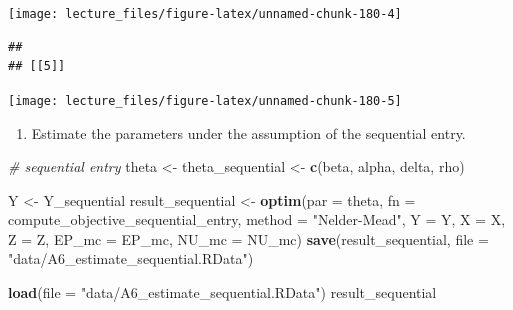 \documentclass[]{book}
\newenvironment{Shaded}{\begin{snugshade}}{\end{snugshade}}
\newcommand{\KeywordTok}[1]{\textcolor[rgb]{0.13,0.29,0.53}{\textbf{#1}}}
\newcommand{\DataTypeTok}[1]{\textcolor[rgb]{0.13,0.29,0.53}{#1}}
\newcommand{\StringTok}[1]{\textcolor[rgb]{0.31,0.60,0.02}{#1}}
\newcommand{\CommentTok}[1]{\textcolor[rgb]{0.56,0.35,0.01}{\textit{#1}}}
\newcommand{\NormalTok}[1]{#1}
\providecommand{\tightlist}{%
  \setlength{\itemsep}{0pt}\setlength{\parskip}{0pt}}
\begin{document}
\begin{center}\texttt{[image: lecture\_files/figure-latex/unnamed-chunk-180-4]} \end{center}

\begin{verbatim}
## 
## [[5]]
\end{verbatim}

\begin{center}\texttt{[image: lecture\_files/figure-latex/unnamed-chunk-180-5]} \end{center}

\begin{enumerate}
\def\labelenumi{\arabic{enumi}.}
\setcounter{enumi}{5}
\tightlist
\item
  Estimate the parameters under the assumption of the sequential entry.
\end{enumerate}

\begin{Shaded}
\begin{Highlighting}[]
\CommentTok{# sequential entry}
\NormalTok{theta <-}\StringTok{ }\NormalTok{theta_sequential <-}
\StringTok{  }\KeywordTok{c}\NormalTok{(beta, alpha, delta, rho)}
\end{Highlighting}
\end{Shaded}

\begin{Shaded}
\begin{Highlighting}[]
\NormalTok{Y <-}\StringTok{ }\NormalTok{Y_sequential}
\NormalTok{result_sequential <-}
\StringTok{  }\KeywordTok{optim}\NormalTok{(}\DataTypeTok{par =}\NormalTok{ theta,}
        \DataTypeTok{fn =}\NormalTok{ compute_objective_sequential_entry,}
        \DataTypeTok{method =} \StringTok{"Nelder-Mead"}\NormalTok{,}
        \DataTypeTok{Y =}\NormalTok{ Y,}
        \DataTypeTok{X =}\NormalTok{ X,}
        \DataTypeTok{Z =}\NormalTok{ Z,}
        \DataTypeTok{EP_mc =}\NormalTok{ EP_mc,}
        \DataTypeTok{NU_mc =}\NormalTok{ NU_mc)}
\KeywordTok{save}\NormalTok{(result_sequential, }\DataTypeTok{file =} \StringTok{"data/A6_estimate_sequential.RData"}\NormalTok{)}
\end{Highlighting}
\end{Shaded}

\begin{Shaded}
\begin{Highlighting}[]
\KeywordTok{load}\NormalTok{(}\DataTypeTok{file =} \StringTok{"data/A6_estimate_sequential.RData"}\NormalTok{)}
\NormalTok{result_sequential}
\end{Highlighting}
\end{Shaded}
\end{document}
